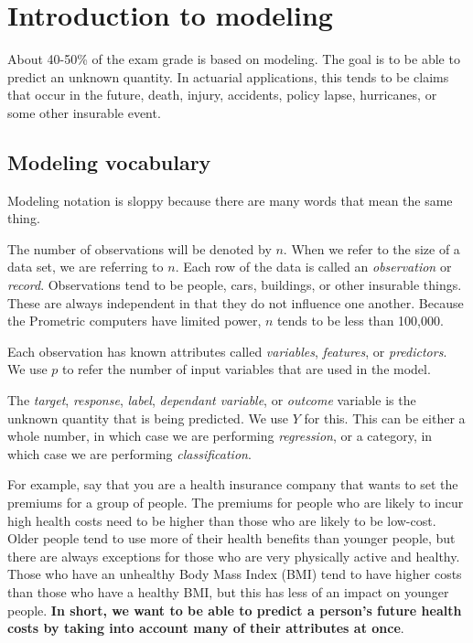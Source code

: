 \documentclass[openany]{book}
\begin{document}
\hypertarget{introduction-to-modeling}{%
\chapter{Introduction to modeling}\label{introduction-to-modeling}}

About 40-50\% of the exam grade is based on modeling. The goal is to be able to predict an unknown quantity. In actuarial applications, this tends to be claims that occur in the future, death, injury, accidents, policy lapse, hurricanes, or some other insurable event.

\hypertarget{modeling-vocabulary}{%
\section{Modeling vocabulary}\label{modeling-vocabulary}}

Modeling notation is sloppy because there are many words that mean the same thing.

The number of observations will be denoted by \(n\). When we refer to the size of a data set, we are referring to \(n\). Each row of the data is called an \emph{observation} or \emph{record}. Observations tend to be people, cars, buildings, or other insurable things. These are always independent in that they do not influence one another. Because the Prometric computers have limited power, \(n\) tends to be less than 100,000.

Each observation has known attributes called \emph{variables}, \emph{features}, or \emph{predictors}. We use \(p\) to refer the number of input variables that are used in the model.

The \emph{target}, \emph{response}, \emph{label}, \emph{dependant variable}, or \emph{outcome} variable is the unknown quantity that is being predicted. We use \(Y\) for this. This can be either a whole number, in which case we are performing \emph{regression}, or a category, in which case we are performing \emph{classification}.

For example, say that you are a health insurance company that wants to set the premiums for a group of people. The premiums for people who are likely to incur high health costs need to be higher than those who are likely to be low-cost. Older people tend to use more of their health benefits than younger people, but there are always exceptions for those who are very physically active and healthy. Those who have an unhealthy Body Mass Index (BMI) tend to have higher costs than those who have a healthy BMI, but this has less of an impact on younger people. \textbf{In short, we want to be able to predict a person's future health costs by taking into account many of their attributes at once}.
\end{document}
